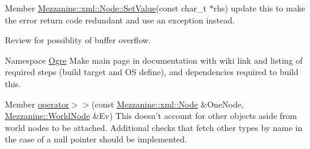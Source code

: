 \label{todo__todo000056}
\hypertarget{todo__todo000056}{}
 
\begin{DoxyDescription}
\item[Member \hyperlink{classMezzanine_1_1xml_1_1Node_a86ca6281c21ba29a3e1476ac7cd5a48f}{Mezzanine::xml::Node::SetValue}(const char\_\-t $\ast$rhs) ]update this to make the error return code redundant and use an exception instead. 

Review for possiblity of buffer overflow. 
\end{DoxyDescription}

\label{todo__todo000011}
\hypertarget{todo__todo000011}{}
 
\begin{DoxyDescription}
\item[Namespace \hyperlink{namespaceOgre}{Ogre} ]Make main page in documentation with wiki link and listing of required steps (build target and OS define), and dependencies required to build this. 
\end{DoxyDescription}

\label{todo__todo000047}
\hypertarget{todo__todo000047}{}
 
\begin{DoxyDescription}
\item[Member \hyperlink{worldnode_8h_a6509ccb839197be1acefdc54e46a62fe}{operator$>$$>$}(const \hyperlink{classMezzanine_1_1xml_1_1Node}{Mezzanine::xml::Node} \&OneNode, \hyperlink{classMezzanine_1_1WorldNode}{Mezzanine::WorldNode} \&Ev) ]This doesn't account for other objects aside from world nodes to be attached. Additional checks that fetch other types by name in the case of a null pointer should be implemented. 
\end{DoxyDescription}